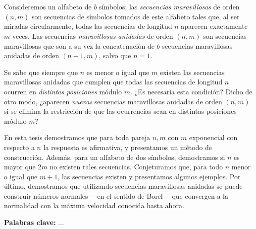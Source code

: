 \chapter*{\runtitulo}

Consideremos un alfabeto de $b$ símbolos; las \emph{secuencias maravillosas}
de orden $(n,m)$ son secuencias de símbolos tomados de este alfabeto
tales que, al ser miradas circularmente, todas las
secuencias de longitud $n$ aparecen exactamente $m$ veces.
Las secuencias \emph{maravillosas anidadas} de orden $(n,m)$ son secuencias
maravillosas que son a su vez la concatenación de $b$ secuencias
maravillosas anidadas de orden $(n-1, m)$, salvo que $n = 1$.

Se sabe que siempre que $n$ es menor o igual que $m$ existen las secuencias
maravillosas anidadas que cumplen que todas las secuencias de longitud $n$
ocurren en \emph{distintas posiciones} módulo $m$.
¿Es necesaria esta condición? Dicho de otro modo, ¿aparecen \emph{nuevas} secuencias
maravillosas anidadas de orden $(n,m)$ si se elimina la restricción de que las
ocurrencias sean en distintas posiciones módulo $m$?

En esta tesis demostramos que para toda pareja $n, m$ con $m$ exponencial con
respecto a $n$ la respuesta es afirmativa, y presentamos un método de construcción.
Además, para un alfabeto de dos símbolos, demostramos si $n$ es mayor que $2m$
no existen tales secuencias.
Conjeturamos que, para todo $n$ menor o igual que $m + 1$, las secuencias
existen y presentamos algunos ejemplos.
Por último, demostramos que utilizando secuencias maravillosas anidadas se puede
construir números normales ---en el sentido de Borel--- que convergen a la
normalidad con la máxima velocidad conocida hasta ahora.

\bigskip

\noindent\textbf{Palabras clave:} ...
